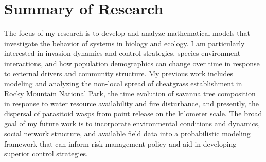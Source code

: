 \documentclass[11pt]{article}
\begin{document}
\newcommand{\diag}{\mbox{diag}}
\newcommand{\bv}[1]{\mathbf{#1}}
\newcommand{\bsy}{\boldsymbol}
\newcommand{\heavi}{\mathcal{H}}
\fancyhf{}
\rfoot{\thepage} %
\pagestyle{fancy}

\section{Summary of Research}
The focus of my research is to develop and analyze mathematical models that investigate the behavior of systems in biology and ecology. I am particularly interested in invasion dynamics and control strategies, species-environment interactions, and how population demographics can change over time in response to external drivers and community structure. My previous work includes modeling and analyzing the non-local spread of cheatgrass establishment in Rocky Mountain National Park, the time evolution of savanna tree composition in response to water resource availability and fire disturbance, and presently, the dispersal of parasitoid wasps from point release on the kilometer scale. The broad goal of my future work is to incorporate environmental conditions and dynamics, social network structure, and available field data into a probabilistic modeling framework that can inform risk management policy and aid in developing superior control strategies.
\end{document}
